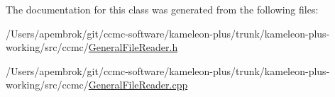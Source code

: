 The documentation for this class was generated from the following files\-:\begin{DoxyCompactItemize}
\item 
/\-Users/apembrok/git/ccmc-\/software/kameleon-\/plus/trunk/kameleon-\/plus-\/working/src/ccmc/\hyperlink{_general_file_reader_8h}{General\-File\-Reader.\-h}\item 
/\-Users/apembrok/git/ccmc-\/software/kameleon-\/plus/trunk/kameleon-\/plus-\/working/src/ccmc/\hyperlink{_general_file_reader_8cpp}{General\-File\-Reader.\-cpp}\end{DoxyCompactItemize}
